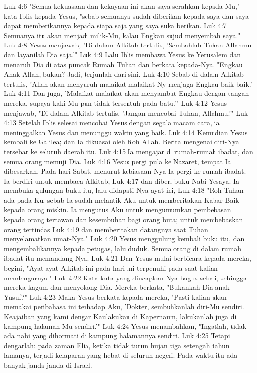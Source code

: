 Luk 4:6  "Semua kekuasaan dan kekayaan ini akan saya serahkan kepada-Mu," kata Iblis kepada Yesus, "sebab semuanya sudah diberikan kepada saya dan saya dapat memberikannya kepada siapa saja yang saya suka berikan.
Luk 4:7  Semuanya itu akan menjadi milik-Mu, kalau Engkau sujud menyembah saya."
Luk 4:8  Yesus menjawab, "Di dalam Alkitab tertulis, 'Sembahlah Tuhan Allahmu dan layanilah Dia saja.'"
Luk 4:9  Lalu Iblis membawa Yesus ke Yerusalem dan menaruh Dia di atas puncak Rumah Tuhan dan berkata kepada-Nya, "Engkau Anak Allah, bukan? Jadi, terjunlah dari sini.
Luk 4:10  Sebab di dalam Alkitab tertulis, 'Allah akan menyuruh malaikat-malaikat-Ny menjaga Engkau baik-baik.'
Luk 4:11  Dan juga, 'Malaikat-malaikat akan menyambut Engkau dengan tangan mereka, supaya kaki-Mu pun tidak tersentuh pada batu.'"
Luk 4:12  Yesus menjawab, "Di dalam Alkitab tertulis, 'Jangan mencobai Tuhan, Allahmu.'"
Luk 4:13  Setelah Iblis selesai mencobai Yesus dengan segala macam cara, ia meninggalkan Yesus dan menunggu waktu yang baik.
Luk 4:14  Kemudian Yesus kembali ke Galilea; dan Ia dikuasai oleh Roh Allah. Berita mengenai diri-Nya tersebar ke seluruh daerah itu.
Luk 4:15  Ia mengajar di rumah-rumah ibadat, dan semua orang memuji Dia.
Luk 4:16  Yesus pergi pula ke Nazaret, tempat Ia dibesarkan. Pada hari Sabat, menurut kebiasaan-Nya Ia pergi ke rumah ibadat. Ia berdiri untuk membaca Alkitab,
Luk 4:17  dan diberi buku Nabi Yesaya. Ia membuka gulungan buku itu, lalu didapati-Nya ayat ini,
Luk 4:18  "Roh Tuhan ada pada-Ku, sebab Ia sudah melantik Aku untuk memberitakan Kabar Baik kepada orang miskin. Ia mengutus Aku untuk mengumumkan pembebasan kepada orang tertawan dan kesembuhan bagi orang buta; untuk membebaskan orang tertindas
Luk 4:19  dan memberitakan datangnya saat Tuhan menyelamatkan umat-Nya."
Luk 4:20  Yesus menggulung kembali buku itu, dan mengembalikannya kepada petugas, lalu duduk. Semua orang di dalam rumah ibadat itu memandang-Nya.
Luk 4:21  Dan Yesus mulai berbicara kepada mereka, begini, "Ayat-ayat Alkitab ini pada hari ini terpenuhi pada saat kalian mendengarnya."
Luk 4:22  Kata-kata yang diucapkan-Nya bagus sekali, sehingga mereka kagum dan menyokong Dia. Mereka berkata, "Bukankah Dia anak Yusuf?"
Luk 4:23  Maka Yesus berkata kepada mereka, "Pasti kalian akan memakai peribahasa ini terhadap Aku, 'Dokter, sembuhkanlah diri-Mu sendiri. Keajaiban yang kami dengar Kaulakukan di Kapernaum, lakukanlah juga di kampung halaman-Mu sendiri.'"
Luk 4:24  Yesus menambahkan, "Ingatlah, tidak ada nabi yang dihormati di kampung halamannya sendiri.
Luk 4:25  Tetapi dengarlah: pada zaman Elia, ketika tidak turun hujan tiga setengah tahun lamanya, terjadi kelaparan yang hebat di seluruh negeri. Pada waktu itu ada banyak janda-janda di Israel.
